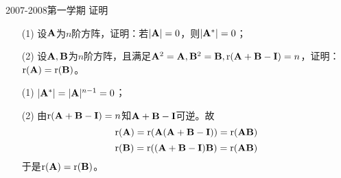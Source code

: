 \begin{frame}
\begin{footnotesize}
\begin{exampleblock}{2007-2008第一学期}
证明
\begin{itemize}
\item[(1)] 设$\A$为$n$阶方阵，证明：若$|\A|=0$，则$|\A^*|=0$；
\item[(2)]  设$\A,\B$为$n$阶方阵，且满足$\A^2=\A,\B^2=\B,\rr(\A+\B-\II)=n$，证明：$\rr(\A)=\rr(\B)$。
\end{itemize}
\end{exampleblock}
\pause\proofname
\begin{itemize}
\item[(1)] $|\A^*|=|\A|^{n-1}=0$；\pause 
\item[(2)]  由$\rr(\A+\B-\II)=n$知$\A+\B-\II$可逆。故
$$
\rr(\A)=\rr(\A(\A+\B-\II))=\rr(\A\B)
$$
$$
\rr(\B)=\rr((\A+\B-\II)\B)=\rr(\A\B)
$$
于是$\rr(\A)=\rr(\B)$。
\end{itemize}
\end{footnotesize}
\end{frame}


